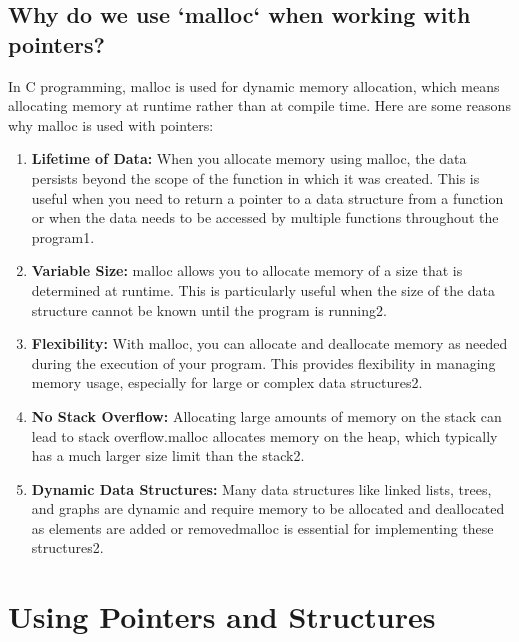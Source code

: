 \subsection{Why do we use `malloc` when working with pointers?}
In C programming, malloc is used for dynamic memory allocation, which means allocating memory at runtime rather than at compile time. Here are some reasons why malloc is used with pointers:
\begin{enumerate}
    \item \textbf{Lifetime of Data:} When you allocate memory using malloc, the data persists beyond the scope of the function in which it was created. This is useful when you need to return a pointer to a data structure from a function or when the data needs to be accessed by multiple functions throughout the program1.
    \item \textbf{Variable Size:} malloc allows you to allocate memory of a size that is determined at runtime. This is particularly useful when the size of the data structure cannot be known until the program is running2.
    \item \textbf{Flexibility:} With malloc, you can allocate and deallocate memory as needed during the execution of your program. This provides flexibility in managing memory usage, especially for large or complex data structures2.
    \item \textbf{No Stack Overflow:} Allocating large amounts of memory on the stack can lead to stack overflow.malloc allocates memory on the heap, which typically has a much larger size limit than the stack2.
    \item \textbf{Dynamic Data Structures:} Many data structures like linked lists, trees, and graphs are dynamic and require memory to be allocated and deallocated as elements are added or removedmalloc is essential for implementing these structures2.
\end{enumerate}




\section{Using Pointers and Structures}
